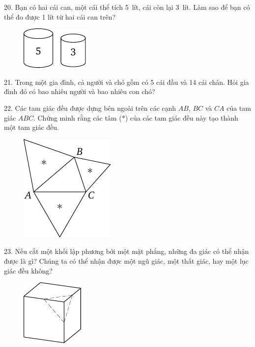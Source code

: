 \begin{problem}{20.}
	Bạn có hai cái can, một cái thể tích 5~lít, cái còn lại 3~lít. Làm sao để bạn có thể đo được 1 lít từ hai cái can trên?
	\begin{figure}
		\includegraphics{resources/taskbook-4}
	\end{figure}
\end{problem}

\begin{problem}{21.}
	Trong một gia đình, cả người và chó gồm có 5 cái đầu và 14 cái chân. Hỏi gia đình đó có bao nhiêu người và bao nhiêu con chó?
\end{problem}

\begin{problem}{22.}
	Các tam giác đều được dựng bên ngoài trên các cạnh $AB$, $BC$ và $CA$ của tam giác $ABC$. Chứng minh rằng các tâm ($*$) của các tam giác đều này tạo thành một tam giác đều.
	\begin{figure}
		\includegraphics{resources/taskbook-6}
	\end{figure}
\end{problem}

\begin{problem}{23.}
	Nếu cắt một khối lập phương bởi một mặt phẳng, những đa giác có thể nhận được là gì? Chúng ta có thể nhận được một ngũ giác, một thất giác, hay một lục giác đều không?
	\begin{figure}
		\includegraphics{resources/taskbook-7}
	\end{figure}
\end{problem}

